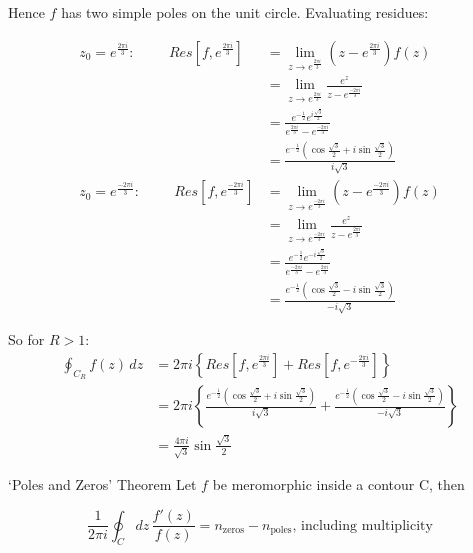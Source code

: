\documentclass{physics_notes}
\begin{document}
\begin{enumerate}[label=\alph*)]
{Hence $f$ has two simple poles on the unit circle. Evaluating residues:

\begin{align*}
z_0 = e^\frac{2\pi i }{3}: \hspace{1cm} Res[f,e^\frac{2\pi i}{3}] &= \lim_{z\to e^\frac{2\pi i}{3}} (z - e^\frac{2\pi i}{3})f(z) \\ 
&= \lim_{z\to e^\frac{2\pi i}{3}} \frac{e^z}{z - e^\frac{-2\pi i}{3}} \\ 
&= \frac{e^{-\frac{1}{2}} e^{i\frac{\sqrt{3}}{2}}}{e^\frac{2\pi i}{3} - e^\frac{-2\pi i}{3}} \\
&= \frac{e^{-\frac{1}{2}} (\cos{\frac{\sqrt{3}}{2}} + i\sin{\frac{\sqrt{3}}{2}}) }{i\sqrt{3}} \\
z_0 = e^\frac{-2\pi i}{3}: \hspace{1cm} Res[f,e^\frac{-2\pi i}{3}] &= \lim_{z\to e^\frac{-2\pi i}{3}} (z - e^\frac{-2\pi i}{3})f(z) \\ 
&= \lim_{z\to e^\frac{-2\pi i}{3}} \frac{e^z}{z - e^\frac{2\pi i}{3}} \\ 
&= \frac{e^{-\frac{1}{2}} e^{-i\frac{\sqrt{3}}{2}}}{e^\frac{-2\pi i}{3} - e^\frac{2\pi i}{3}} \\
&= \frac{e^{-\frac{1}{2}} (\cos{\frac{\sqrt{3}}{2}} - i\sin{\frac{\sqrt{3}}{2}}) }{-i\sqrt{3}}
\end{align*}

So for $R>1$: \begin{align*} 
\oint_{C_R} f(z)\, dz &= 2\pi i \left\{Res[f,e^\frac{2\pi i }{3}] + Res[f, e^{-\frac{2\pi i}{3}}]\right\} \\
&= 2\pi i \left\{ \frac{e^{-\frac{1}{2}} (\cos{\frac{\sqrt{3}}{2}} + i\sin{\frac{\sqrt{3}}{2}}) }{i\sqrt{3}} + \frac{e^{-\frac{1}{2}} (\cos{\frac{\sqrt{3}}{2}} - i\sin{\frac{\sqrt{3}}{2}}) }{-i\sqrt{3}} \right\} \\
&= \frac{4\pi i}{\sqrt{3}} \sin{\frac{\sqrt{3}}{2}}
\end{align*}
}
\end{enumerate}

\begin{theorem}{`Poles and Zeros' Theorem}
Let $f$ be meromorphic inside a contour C, then

\begin{equation}\label{thm:poles_and_zeros}
\frac{1}{2\pi i} \oint_C dz \, \frac{f'(z)}{f(z)} = n_\text{zeros} - n_\text{poles} \text{, including multiplicity}
\end{equation}

\end{theorem}
\end{document}
